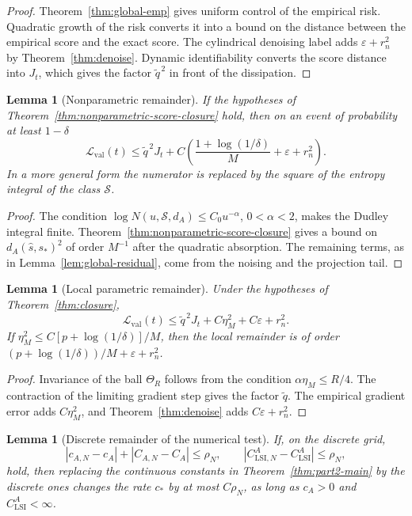 \documentclass{article}
\newtheorem{lemma}[theorem]{Lemma}
\newcommand{\Eval}{\mathcal L_{\mathrm{val}}}
\begin{document}
\begin{proof}
Theorem~\ref{thm:global-emp} gives uniform control of the empirical risk.
Quadratic growth of the risk converts it into a bound on the distance between the
empirical score and the exact score. The cylindrical denoising label adds
\(\varepsilon+r_n^2\) by Theorem~\ref{thm:denoise}. Dynamic identifiability
converts the score distance into \(J_t\), which gives the factor
\(\widetilde q^{\,2}\) in front of the dissipation.
\end{proof}

\begin{lemma}[Nonparametric remainder]
\label{lem:nonparametric-residual}
If the hypotheses of Theorem~\ref{thm:nonparametric-score-closure} hold, then on
an event of probability at least \(1-\delta\)
\[
        \Eval(t)\le \widetilde q^{\,2}J_t+
        C\left(
        \frac{1+\log(1/\delta)}{M}+\varepsilon+r_n^2
        \right).
\]
In a more general form the numerator is replaced by the square of the entropy
integral of the class \(\mathcal S\).
\end{lemma}

\begin{proof}
The condition \(\log N(u,\mathcal S,d_A)\le C_0u^{-\alpha}\), \(0<\alpha<2\),
makes the Dudley integral finite. Theorem~\ref{thm:nonparametric-score-closure}
gives a bound on \(d_A(\widehat s,s_*)^2\) of order \(M^{-1}\) after the quadratic
absorption. The remaining terms, as in Lemma~\ref{lem:global-residual}, come from
the noising and the projection tail.
\end{proof}

\begin{lemma}[Local parametric remainder]
\label{lem:local-residual}
Under the hypotheses of Theorem~\ref{thm:closure},
\[
        \Eval(t)\le \widetilde q^{\,2}J_t+C\eta_M^2+C\varepsilon+r_n^2 .
\]
If \(\eta_M^2\le C[p+\log(1/\delta)]/M\), then the local remainder is of order
\((p+\log(1/\delta))/M+\varepsilon+r_n^2\).
\end{lemma}

\begin{proof}
Invariance of the ball \(\Theta_R\) follows from the condition
\(\alpha\eta_M\le R/4\). The contraction of the limiting gradient step gives the
factor \(\widetilde q\). The empirical gradient error adds \(C\eta_M^2\), and
Theorem~\ref{thm:denoise} adds \(C\varepsilon+r_n^2\).
\end{proof}

\begin{lemma}[Discrete remainder of the numerical test]
\label{lem:numerical-residual}
If, on the discrete grid,
\[
        |c_{A,N}-c_A|+|C_{A,N}-C_A|\le \rho_N,
        \qquad
        |C_{\mathrm{LSI},N}^A-C_{\mathrm{LSI}}^A|\le \rho_N,
\]
hold, then replacing the continuous constants in Theorem~\ref{thm:part2-main} by
the discrete ones changes the rate \(c_*\) by at most \(C\rho_N\), as long as
\(c_A>0\) and \(C_{\mathrm{LSI}}^A<\infty\).
\end{lemma}
\end{document}
